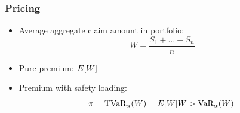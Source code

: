 \begin{frame}
  \frametitle{Pricing}

  \begin{itemize}
  \item Average aggregate claim amount in portfolio:
    \begin{equation*}
      W = \frac{S_1 + \dots + S_n}{n}
    \end{equation*}
  \item<2-> Pure premium: $E [ W ]$
  \item<3-> Premium with safety loading:
    \begin{equation*}
      \pi = \text{TVaR}_\alpha(W) = E [ W|W > \text{VaR}_\alpha(W) ]
    \end{equation*}
  \end{itemize}
\end{frame}


